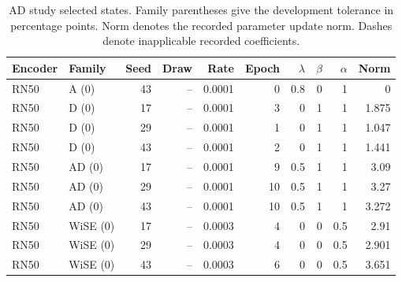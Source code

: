 \begin{table}[t]
\centering
\scriptsize
\setlength{\tabcolsep}{3pt}
\begin{tabular}{llrrrrrrrr}
\toprule
Encoder & Family & Seed & Draw & Rate & Epoch & $\lambda$ & $\beta$ & $\alpha$ & Norm\\
\midrule
RN50 & A (0) & 43 & -- & 0.0001 & 0 & 0.8 & 0 & 1 & 0\\
RN50 & D (0) & 17 & -- & 0.0001 & 3 & 0 & 1 & 1 & 1.875\\
RN50 & D (0) & 29 & -- & 0.0001 & 1 & 0 & 1 & 1 & 1.047\\
RN50 & D (0) & 43 & -- & 0.0001 & 2 & 0 & 1 & 1 & 1.441\\
RN50 & AD (0) & 17 & -- & 0.0001 & 9 & 0.5 & 1 & 1 & 3.09\\
RN50 & AD (0) & 29 & -- & 0.0001 & 10 & 0.5 & 1 & 1 & 3.27\\
RN50 & AD (0) & 43 & -- & 0.0001 & 10 & 0.5 & 1 & 1 & 3.272\\
RN50 & WiSE (0) & 17 & -- & 0.0003 & 4 & 0 & 0 & 0.5 & 2.91\\
RN50 & WiSE (0) & 29 & -- & 0.0003 & 4 & 0 & 0 & 0.5 & 2.901\\
RN50 & WiSE (0) & 43 & -- & 0.0003 & 6 & 0 & 0 & 0.5 & 3.651\\
\bottomrule
\end{tabular}
\caption{AD study selected states. Family parentheses give the development tolerance in percentage points. Norm denotes the recorded parameter update norm. Dashes denote inapplicable recorded coefficients.}\label{tab:adselected80}
\end{table}


